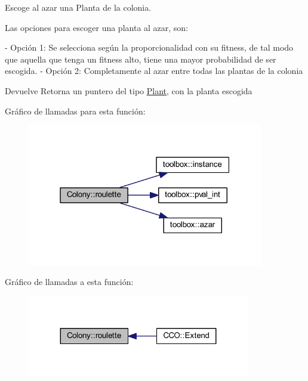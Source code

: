 Escoge al azar una Planta de la colonia. 

Las opciones para escoger una planta al azar, son\+: \begin{DoxyVerb}- Opción 1: Se selecciona según la proporcionalidad con su fitness, de tal modo que aquella que tenga un fitness alto, tiene una mayor probabilidad de ser escogida.
- Opción 2: Completamente al azar entre todas las plantas de la colonia
\end{DoxyVerb}


\begin{DoxyReturn}{Devuelve}
Retorna un puntero del tipo \hyperlink{class_plant}{Plant}, con la planta escogida 
\end{DoxyReturn}


Gráfico de llamadas para esta función\+:
\nopagebreak
\begin{figure}[H]
\begin{center}
\leavevmode
\includegraphics[width=292pt]{class_colony_a095984a4b9d66dccd04512f77b70fbe9_cgraph}
\end{center}
\end{figure}




Gráfico de llamadas a esta función\+:
\nopagebreak
\begin{figure}[H]
\begin{center}
\leavevmode
\includegraphics[width=275pt]{class_colony_a095984a4b9d66dccd04512f77b70fbe9_icgraph}
\end{center}
\end{figure}


